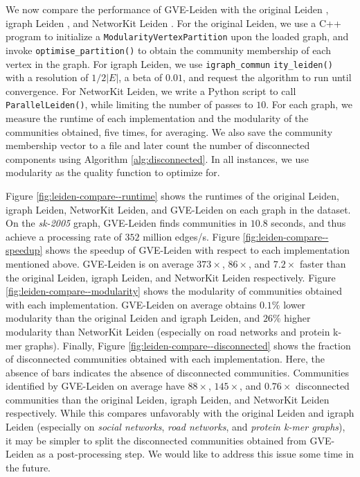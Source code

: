 We now compare the performance of GVE-Leiden with the original Leiden \cite{com-traag19}, igraph Leiden \cite{csardi2006igraph}, and NetworKit Leiden \cite{staudt2016networkit}. For the original Leiden, we use a C++ program to initialize a \texttt{ModularityVertexPartition} upon the loaded graph, and invoke \texttt{optimise\_partition()} to obtain the community membership of each vertex in the graph. For igraph Leiden, we use \texttt{igraph\_commun} \texttt{ity\_leiden()} with a resolution of $1/2|E|$, a beta of $0.01$, and request the algorithm to run until convergence. For NetworKit Leiden, we write a Python script to call \texttt{ParallelLeiden()}, while limiting the number of passes to $10$. For each graph, we measure the runtime of each implementation and the modularity of the communities obtained, five times, for averaging. We also save the community membership vector to a file and later count the number of disconnected components using Algorithm \ref{alg:disconnected}. In all instances, we use modularity as the quality function to optimize for.

Figure \ref{fig:leiden-compare--runtime} shows the runtimes of the original Leiden, igraph Leiden, NetworKit Leiden, and GVE-Leiden on each graph in the dataset. On the \textit{sk-2005} graph, GVE-Leiden finds communities in $10.8$ seconds, and thus achieve a processing rate of $352$ million edges/s. Figure \ref{fig:leiden-compare--speedup} shows the speedup of GVE-Leiden with respect to each implementation mentioned above. GVE-Leiden is on average $373\times$, $86\times$, and $7.2\times$ faster than the original Leiden, igraph Leiden, and NetworKit Leiden respectively. Figure \ref{fig:leiden-compare--modularity} shows the modularity of communities obtained with each implementation. GVE-Leiden on average obtains $0.1\%$ lower modularity than the original Leiden and igraph Leiden, and $26\%$ higher modularity than NetworKit Leiden (especially on road networks and protein k-mer graphs). Finally, Figure \ref{fig:leiden-compare--disconnected} shows the fraction of disconnected communities obtained with each implementation. Here, the absence of bars indicates the absence of disconnected communities. Communities identified by GVE-Leiden on average have $88\times$, $145\times$, and $0.76\times$ disconnected communities than the original Leiden, igraph Leiden, and NetworKit Leiden respectively. While this compares unfavorably with the original Leiden and igraph Leiden (especially on \textit{social networks}, \textit{road networks}, and \textit{protein k-mer graphs}), it may be simpler to split the disconnected communities obtained from GVE-Leiden as a post-processing step. We would like to address this issue some time in the future.

